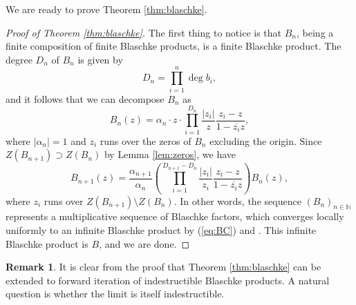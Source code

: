 \documentclass[a4paper,11pt]{article}
\theoremstyle{plain}
\theoremstyle{definition}
\theoremstyle{definition}
\newtheorem*{remark}{Remark}
\begin{document}
We are ready to prove Theorem \ref{thm:blaschke}.
\begin{proof}[Proof of Theorem \ref{thm:blaschke}]
The first thing to notice is that $B_n$, being a finite composition of finite Blaschke products, is a finite Blaschke product. The degree $D_n$ of $B_n$ is given by
\[ D_n = \prod_{i=1}^n \deg b_i, \]
and it follows that we can decompose $B_n$ as
\[ B_n(z) = \alpha_n\cdot z\cdot \prod_{i=1}^{D_n} \frac{|z_i|}{z}\frac{z_i - z}{1 - \overline{z_i}z}, \]
where $|\alpha_n| = 1$ and $z_i$ runs over the zeros of $B_n$ excluding the origin. Since $Z(B_{n+1})\supset Z(B_n)$ by Lemma \ref{lem:zeros}, we have
\[ B_{n+1}(z) = \frac{\alpha_{n+1}}{\alpha_n}\left(\prod_{i=1}^{D_{n+1} - D_n} \frac{|z_i|}{z_i}\frac{z_i - z}{1 - \overline{z_i}z}\right)B_n(z), \]
where $z_i$ runs over $Z(B_{n+1})\setminus Z(B_n)$. In other words, the sequence $(B_n)_{n\in\mathbb{N}}$ represents a multiplicative sequence of Blaschke factors, which converges locally uniformly to an infinite Blaschke product by (\ref{eq:BC}) and \cite[Theorem 2.4]{Dur70}. This infinite Blaschke product is $B$, and we are done.
\end{proof}
\begin{remark}
It is clear from the proof that Theorem \ref{thm:blaschke} can be extended to forward iteration of indestructible Blaschke products. A natural question is whether the limit is itself indestructible.
\end{remark}
\end{document}
